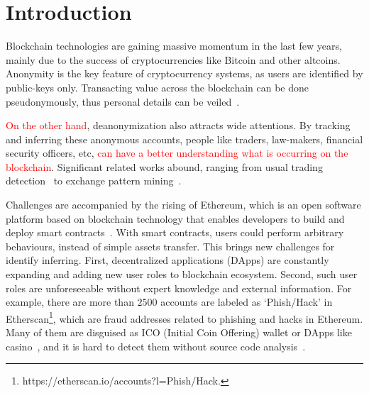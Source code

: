 \section{Introduction}
Blockchain technologies are gaining massive momentum in the last few years, mainly due to the success of cryptocurrencies like Bitcoin and other altcoins. Anonymity is the key feature of cryptocurrency systems, as users are identified by public-keys only. Transacting value across the blockchain can be done pseudonymously, thus personal details can be veiled~\cite{reid2013analysis}.

\textcolor{red}{On the other hand}, deanonymization also attracts wide attentions. By tracking and inferring these anonymous accounts, people like traders, law-makers, financial security officers, etc, \textcolor{red}{can have a better understanding what is occurring on the blockchain}. Significant related works abound, ranging from usual trading detection~\cite{maesa2016analysis} to exchange pattern mining~\cite{ranshous2017exchange}.
 

Challenges are accompanied by the rising of Ethereum, which is an open software platform based on blockchain technology that enables developers to build and deploy smart contracts~\cite{buterin2013ethereum}.
With smart contracts, users could perform arbitrary behaviours, instead of simple assets transfer. This brings new challenges for identify inferring. First, decentralized applications (DApps) are constantly expanding and adding new user roles to blockchain ecosystem. Second, such user roles are unforeseeable without expert knowledge and external information.
For example, there are more than $2500$ accounts are labeled as `Phish/Hack' in Etherscan\footnote{https://etherscan.io/accounts?l=Phish/Hack.}, which are fraud addresses related to phishing and hacks in Ethereum. Many of them are disguised as ICO (Initial Coin Offering) wallet or DApps like casino~\cite{cerchiello2018icos}, and it is hard to detect them without source code analysis~\cite{jiang2018contractfuzzer}. 

